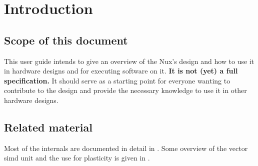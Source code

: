 \chapter{Introduction}

\section{Scope of this document}
This user guide intends to give an overview of the Nux's design and how to use it in hardware designs and for executing software on it.
\textbf{It is not (yet) a full specification.}
It should serve as a starting point for everyone wanting to contribute to the design and provide the necessary knowledge to use it in other hardware designs.

\section{Related material}
Most of the internals are documented in detail in \cite{friedmann13phd}.
Some overview of the vector \gls{simd} unit and the use for plasticity is given in \cite{dlspaper15}.
